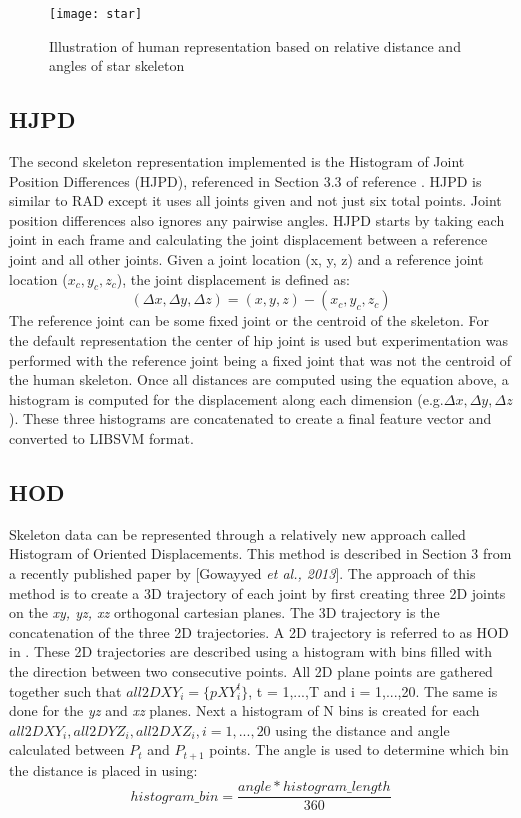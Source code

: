 \documentclass[11pt,nocopyrightspace]{config}
\begin{document}
\begin{figure}
	\centering
	\texttt{[image: star]}
	\caption{Illustration of human representation based on relative distance and angles of star skeleton}
	\label{fig:star}
\end{figure}

\subsection{HJPD}

The second skeleton representation implemented is the Histogram of Joint Position Differences (HJPD), referenced in Section 3.3 of reference \cite{hjpdPaper}. HJPD is similar to RAD except it uses all joints given and not just six total points. Joint position differences also ignores any pairwise angles. HJPD starts by taking each joint in each frame and calculating the joint displacement between a reference joint and all other joints. Given a joint location (x, y, z) and a reference joint location ($x_c, y_c, z_c$), the joint displacement is defined as:
\begin{equation}
(\Delta{x}, \Delta{y}, \Delta{z}) = (x, y, z) - (x_c, y_c, z_c)
\end{equation}
The reference joint can be some fixed joint or the centroid of the skeleton. For the default representation the center of hip joint is used but experimentation was performed with the reference joint being a fixed joint that was not the centroid of the human skeleton. Once all distances are computed using the equation above, a histogram is computed for the displacement along each dimension (e.g.$ \Delta{x}, \Delta{y}, \Delta{z}$). These three histograms are concatenated to create a final feature vector and converted to LIBSVM format.

\subsection{HOD}

Skeleton data can be represented through a relatively new approach called Histogram of Oriented Displacements. This method is described in Section 3 from a recently published paper by [Gowayyed \textit{et al., 2013}]. The approach of this method is to create a 3D trajectory of each joint by first creating three 2D joints on the \emph{xy, yz, xz} orthogonal cartesian planes. The 3D trajectory is the concatenation of the three 2D trajectories. A 2D trajectory is referred to as HOD in \cite{hodPaper}. These 2D trajectories are described using a histogram with bins filled with the direction between two consecutive points. All 2D plane points are gathered together such that $all2DXY_i = \{ pXY_i^t \}$, t = 1,...,T and i = 1,...,20. The same is done for the \emph{yz} and \emph{xz} planes. Next a histogram of N bins is created for each $all2DXY_i, all2DYZ_i, all2DXZ_i, i = 1,...,20$ using the distance and angle calculated between $P_t$ and $P_{t+1}$ points. The angle is used to determine which bin the distance is placed in using:
\begin{equation}
histogram\_bin = \frac{angle * histogram\_length}{360}
\end{equation}
\end{document}
